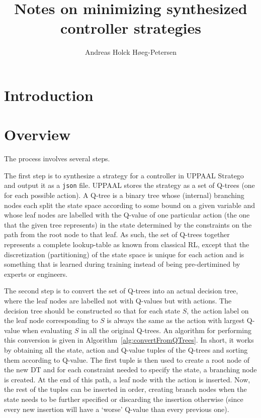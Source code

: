 \documentclass{article}
\title{Notes on minimizing synthesized controller strategies}
\author{Andreas Holck Høeg-Petersen}
\begin{document}
\maketitle

\section{Introduction}%
\label{sec:intro}

\lipsum[1]

\section{Overview}%
\label{sec:overview}

The process involves several steps.

The first step is to synthesize a strategy for a controller in UPPAAL Stratego
and output it as a \texttt{json} file. UPPAAL stores the strategy as a set of
Q-trees (one for each possible action). A Q-tree is a binary tree whose
(internal) branching nodes each split the state space according to some bound on
a given variable and whose leaf nodes are labelled with the Q-value of one
particular action (the one that the given tree represents) in the state
determined by the constraints on the path from the root node to that leaf. As
such, the set of Q-trees together represents a complete lookup-table as known
from classical RL, except that the discretization (partitioning) of the state
space is unique for each action and is something that is learned during training
instead of being pre-dertimined by experts or engineers.

The second step is to convert the set of Q-trees into an actual decision tree,
where the leaf nodes are labelled not with Q-values but with actions. The
decision tree should be constructed so that for each state $S$, the action label
on the leaf node corresponding to $S$ is always the same as the action with
largest Q-value when evaluating $S$ in all the original Q-trees. An algorithm
for performing this conversion is given in
Algorithm~\ref{alg:convertFromQTrees}. In short, it works by obtaining all the
state, action and Q-value tuples of the Q-trees and sorting them according to
Q-value. The first tuple is then used to create a root node of the new DT and
for each constraint needed to specify the state, a branching node is created. At
the end of this path, a leaf node with the action is inserted. Now, the rest of
the tuples can be inserted in order, creating branch nodes when the state needs
to be further specified or discarding the insertion otherwise (since every new
insertion will have a `worse' Q-value than every previous one).
\end{document}
